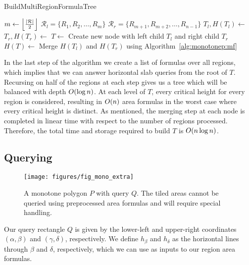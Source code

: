 \begin{algorithm}
\LinesNumbered
\DontPrintSemicolon
\caption{BuildMultiRegionFormulaTree}
\label{alg:monotonep:bmft}
\BlankLine
{}
$m \gets \left\lfloor\frac{|\mathcal{R}|}{2}\right\rfloor$\;
$\mathcal{R}_l = \{ R_1, R_2, \ldots, R_m \}$\;
$\mathcal{R}_r = \{ R_{m+1}, R_{m+2}, \ldots, R_{n-1} \}$\;
$T_l, H(T_l) \gets $ \;
$T_r, H(T_r) \gets $ \;
$T \gets $ Create new node with left child $T_l$ and right child $T_r$\;
$H(T) \gets $ Merge $H(T_l)$ and $H(T_r)$ using Algorithm~\ref{alg:monotonep:mf}\;
\BlankLine
{}
\end{algorithm}

In the last step of the algorithm we create a list of formulas over all regions, which implies that we can answer horizontal slab queries from the root of $T$. Recursing on half of the regions at each step gives us a tree which will be balanced with depth $O\!\left(\log{n}\right)$. At each level of $T$, every critical height for every region is considered, resulting in $O\!\left(n\right)$ area formulas in the worst case where every critical height is distinct. As mentioned, the merging step at each node is completed in linear time with respect to the number of regions processed. Therefore, the total time and storage required to build $T$ is $O\!\left(n\log{n}\right)$.  


\subsection{Querying}
\label{:monotonep:rect:querying}

\begin{figure}[t]
\begin{center}
  \texttt{[image: figures/fig\_mono\_extra]}
  \caption[Details of a query on a monotone polygon.]{A monotone polygon $P$ with query $Q$. The tiled areas cannot be queried using preprocessed area formulas and will require special handling.}
  \label{fig:monotonep:extra}
\end{center}
\end{figure}

Our query rectangle $Q$ is given by the lower-left and upper-right coordinates $(\alpha, \beta)$ and $(\gamma, \delta)$, respectively. We define $h_\beta$ and $h_\delta$ as the horizontal lines through $\beta$ and $\delta$, respectively, which we can use as inputs to our region area formulas.

